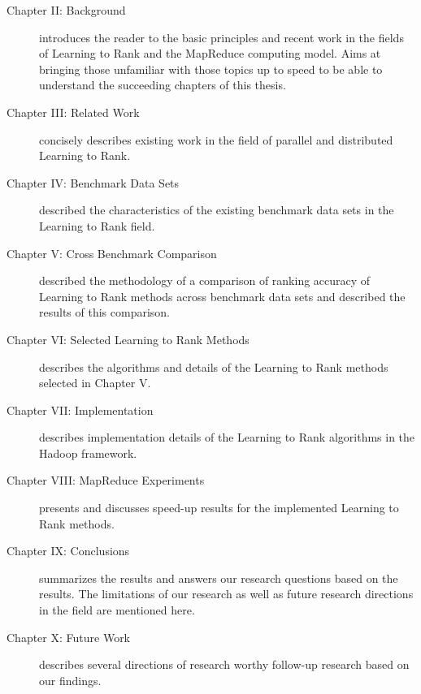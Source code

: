 \begin{description}
\item[Chapter II: Background]{introduces the reader to the basic principles and recent work in the fields of Learning to Rank and the MapReduce computing model. Aims at bringing those unfamiliar with those topics up to speed to be able to understand the succeeding chapters of this thesis.}
\item[Chapter III: Related Work]{concisely describes existing work in the field of parallel and distributed Learning to Rank.}
\item[Chapter IV: Benchmark Data Sets]{described the characteristics of the existing benchmark data sets in the Learning to Rank field.}
\item[Chapter V: Cross Benchmark Comparison]{described the methodology of a comparison of ranking accuracy of Learning to Rank methods across benchmark data sets and described the results of this comparison.}
\item[Chapter VI: Selected Learning to Rank Methods]{describes the algorithms and details of the Learning to Rank methods selected in Chapter V.}
\item[Chapter VII: Implementation]{describes implementation details of the Learning to Rank algorithms in the Hadoop framework.}
\item[Chapter VIII: MapReduce Experiments]{presents and discusses speed-up results for the implemented Learning to Rank methods.}
\item[Chapter IX: Conclusions]{summarizes the results and answers our research questions based on the results. The limitations of our research as well as future research directions in the field are mentioned here.}
\item[Chapter X: Future Work]{describes several directions of research worthy follow-up research based on our findings.}
\end{description}